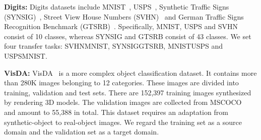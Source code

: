 \documentclass[journal,twocolumn]{IEEEtran}
\theoremstyle{definition}
\begin{document}
{\bf Digits:} Digits datasets include MNIST~\cite{726791}, USPS~\cite{291440}, Synthetic Traffic Signs (SYNSIG)~\cite{10.1007/978-3-319-02895-8_52}, Street View House Numbers (SVHN)~\cite{37648} and German Traffic Signs Recognition Benchmark (GTSRB)~\cite{6033395}. Specifically, MNIST, USPS and SVHN consist of 10 classes, whereas SYNSIG and GTSRB consist of 43 classes. We set four transfer tasks: SVHNMNIST, SYNSIGGTSRB, MNISTUSPS and USPSMNIST.

{\bf VisDA:} VisDA~\cite{peng2017visda:} is a more complex object classification dataset. It contains more than 280K images belonging to 12 categories. These images are divided into training, validation and test sets. There are 152,397 training images synthesized by rendering 3D models. The validation images are collected from MSCOCO~\cite{lin2014microsoft} and amount to 55,388 in total. This dataset requires an adaptation from synthetic-object to real-object images. We regard the training set as a source domain and the validation set as a target domain. 
\end{document}
